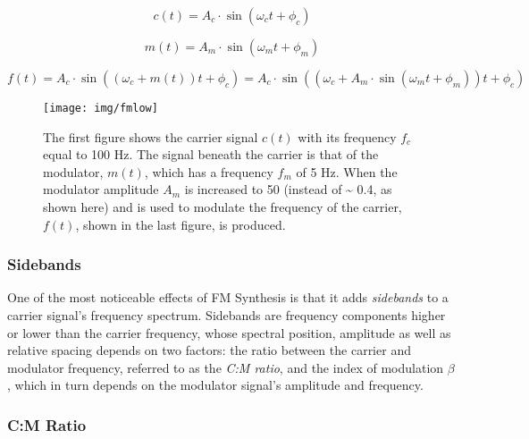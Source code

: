 \pagebreak

\begin{multicols}{2}

  \begin{equation}
    c(t) = A_{c} \cdot \sin(\omega_{c}t + \phi_{c})
    \end{equation}

    \begin{equation}
      m(t) = A_{m} \cdot \sin(\omega_{m}t + \phi_{m})
    \end{equation}

\end{multicols}

\begin{equation}
  f(t) = A_{c} \cdot \sin((\omega_{c} + m(t))t + \phi_{c}) = A_{c} \cdot \sin((\omega_{c} + A_{m} \cdot \sin(\omega_{m}t + \phi_{m}))t + \phi_{c})
  \label{eq:fm}
\end{equation}

\begin{figure}
  \texttt{[image: img/fmlow]}
  \caption{The first figure shows the carrier signal $c(t)$ with its frequency $f_{c}$ equal to 100 Hz. The signal beneath the carrier is that of the modulator, $m(t)$, which has a frequency $f_{m}$ of 5 Hz. When the modulator amplitude $A_{m}$ is increased to 50 (instead of \textasciitilde{} 0.4, as shown here) and is used to modulate the frequency of the carrier, $f(t)$, shown in the last figure, is produced.}
  \label{fig:fmlow}
\end{figure}

  \subsubsection{Sidebands}

One of the most noticeable effects of FM Synthesis is that it adds \emph{sidebands} to a carrier signal's frequency spectrum. Sidebands are frequency components higher or lower than the carrier frequency, whose spectral position, amplitude as well as relative spacing depends on two factors: the ratio between the carrier and modulator frequency, referred to as the \emph{C:M ratio}, and the index of modulation $\beta$, which in turn depends on the modulator signal's amplitude and frequency.

\pagebreak

  \subsubsection{C:M Ratio}

